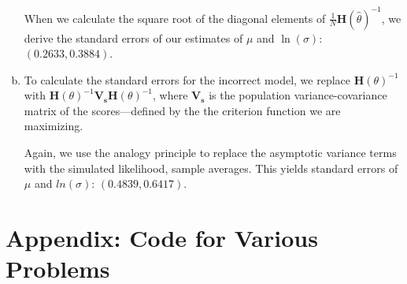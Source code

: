 \documentclass[11pt]{article}
\begin{document}
\begin{enumerate}[a)]
	When we calculate the square root of the diagonal elements of $\frac{1}{N}\mathbf{H}(\hat \theta)^{-1}$, we derive the standard errors of our estimates of $\mu$ and $\ln(\sigma)$: $(0.2633,0.3884)$.
	
	\item To calculate the standard errors for the incorrect model, we replace $\mathbf{H}(\theta)^{-1}$ with $\mathbf{H}(\theta)^{-1}\mathbf{V_s}\mathbf{H}(\theta)^{-1}$, where $\mathbf{V_s}$ is the population variance-covariance matrix of the scores---defined by the the criterion function we are maximizing. 

	Again, we use the analogy principle to replace the asymptotic variance terms with the simulated likelihood, sample averages. This yields standard errors of $\mu$ and $ln(\sigma)$: $(0.4839,0.6417)$.

\end{enumerate}

\section*{Appendix: Code for Various Problems}






\end{document}
